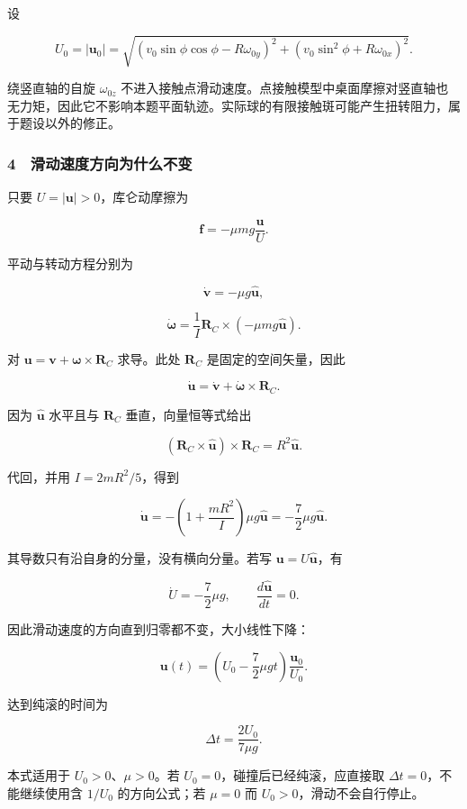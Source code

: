 \documentclass[12pt,a4paper,fontset=fandol]{ctexart}
\begin{document}
设

\[U_0=|\boldsymbol u_0|
=\sqrt{(v_0\sin\phi\cos\phi-R\omega_{0y})^2
+(v_0\sin^2\phi+R\omega_{0x})^2}.\]

绕竖直轴的自旋 \(\omega_{0z}\)
不进入接触点滑动速度。点接触模型中桌面摩擦对竖直轴也无力矩，因此它不影响本题平面轨迹。实际球的有限接触斑可能产生扭转阻力，属于题设以外的修正。

\subsubsection{4　滑动速度方向为什么不变}\label{ux6ed1ux52a8ux901fux5ea6ux65b9ux5411ux4e3aux4ec0ux4e48ux4e0dux53d8}

只要 \(U=|\boldsymbol u|>0\)，库仑动摩擦为

\[\boldsymbol f=-\mu mg\frac{\boldsymbol u}{U}.\]

平动与转动方程分别为

\[\dot{\boldsymbol v}=-\mu g\widehat{\boldsymbol u},\]

\[\dot{\boldsymbol\omega}
=\frac1I\boldsymbol R_C\times(-\mu mg\widehat{\boldsymbol u}).\]

对
\(\boldsymbol u=\boldsymbol v+\boldsymbol\omega\times\boldsymbol R_C\)
求导。此处 \(\boldsymbol R_C\) 是固定的空间矢量，因此

\[\dot{\boldsymbol u}
=\dot{\boldsymbol v}+\dot{\boldsymbol\omega}\times\boldsymbol R_C.\]

因为 \(\widehat{\boldsymbol u}\) 水平且与 \(\boldsymbol R_C\)
垂直，向量恒等式给出

\[ (\boldsymbol R_C\times\widehat{\boldsymbol u})\times\boldsymbol R_C
=R^2\widehat{\boldsymbol u}.\]

代回，并用 \(I=2mR^2/5\)，得到

\[\boxed{\dot{\boldsymbol u}
=-\left(1+\frac{mR^2}{I}\right)\mu g\widehat{\boldsymbol u}
=-\frac72\mu g\widehat{\boldsymbol u}.}\]

其导数只有沿自身的分量，没有横向分量。若写
\(\boldsymbol u=U\widehat{\boldsymbol u}\)，有

\[\dot U=-\frac72\mu g,
\qquad \frac{d\widehat{\boldsymbol u}}{dt}=0.\]

因此滑动速度的方向直到归零都不变，大小线性下降：

\[\boldsymbol u(t)
=\left(U_0-\frac72\mu gt\right)\frac{\boldsymbol u_0}{U_0}.\]

达到纯滚的时间为

\[\boxed{\Delta t=\frac{2U_0}{7\mu g}.}\]

本式适用于 \(U_0>0\)、\(\mu>0\)。若 \(U_0=0\)，碰撞后已经纯滚，应直接取
\(\Delta t=0\)，不能继续使用含 \(1/U_0\) 的方向公式；若 \(\mu=0\) 而
\(U_0>0\)，滑动不会自行停止。
\end{document}
